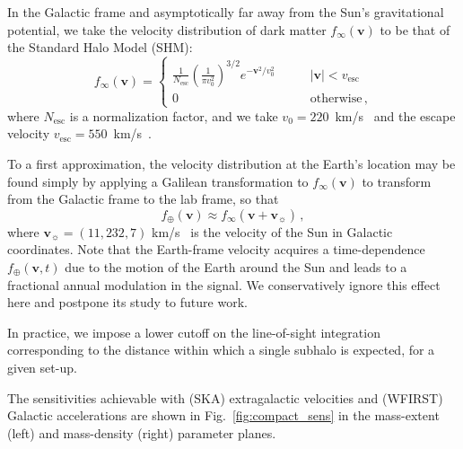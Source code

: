 \documentclass[twocolumn]{aastex63}
\newcommand{\vect}[1]{\boldsymbol{\mathbf{#1}}}
\newcommand{\vesc}{v_\text{esc}}
\begin{document}
In the Galactic frame and asymptotically far away from the Sun's gravitational potential, we take the velocity distribution of dark matter $f_\infty (\vect{v})$ to be that of the Standard Halo Model (SHM):
\begin{equation}{
 f_{\infty} (\vect{v}) = \left\{ \begin{array}{ll}
{\frac{1}{N_{\text{esc}}} } \left( {\frac{1}{\pi v_0^2}} \right)^{3/2} e^{- \vect{v}^2 / v_0^2 } \qquad &|\vect{v}| < \vesc \\
0 \, \qquad &\text{otherwise} \,,
\end{array}
\right.
}
\end{equation}
where $N_{\text{esc}}$ is a normalization factor, and we take $v_{0}=220$~km/s~\cite{Kerr:1986hz} and the escape velocity $\vesc=550$~km/s~\cite{Piffl:2013mla}.

To a first approximation, the velocity distribution at the Earth's location may be found simply by applying a Galilean transformation to $f_\infty (\vect{v})$ to transform from the Galactic frame to the lab frame, so that    
\begin{equation}
 f_\oplus (\vect{v}) \approx f_{\infty} \left( \vect{v} + \vect{v}_\sun \right) \,,
\end{equation}
where $\vect{v_\sun} = (11, 232, 7)$ km/s~\cite{Schoenrich:2009bx} is the velocity of the Sun in Galactic coordinates. Note that the Earth-frame velocity acquires a time-dependence $f_\oplus (\vect{v},t)$ due to the motion of the Earth around the Sun and leads to a fractional annual modulation in the signal. We conservatively ignore this effect here and postpone its study to future work.

In practice, we impose a lower cutoff on the line-of-sight integration corresponding to the distance within which a single subhalo is expected, for a given set-up.

The sensitivities achievable with (SKA) extragalactic velocities and (WFIRST) Galactic accelerations are shown in Fig.~\ref{fig:compact_sens} in the mass-extent (left) and mass-density (right) parameter planes.
\end{document}
